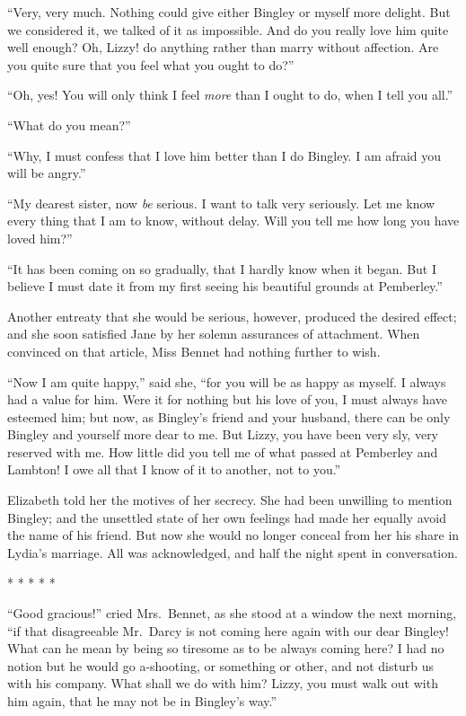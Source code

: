 ``Very, very much.  Nothing could give either Bingley or
myself more delight.  But we considered it, we talked of it as
impossible.  And do you really love him quite well enough?
Oh, Lizzy! do anything rather than marry without affection.
Are you quite sure that you feel what you ought to do?''

``Oh, yes!  You will only think I feel \emph{more} than I ought to
do, when I tell you all.''

``What do you mean?''

``Why, I must confess that I love him better than I do Bingley.
I am afraid you will be angry.''

``My dearest sister, now \emph{be} serious.  I want to talk very
seriously.  Let me know every thing that I am to know, without
delay.  Will you tell me how long you have loved him?''

``It has been coming on so gradually, that I hardly know when it
began.  But I believe I must date it from my first seeing his
beautiful grounds at Pemberley.''

Another entreaty that she would be serious, however, produced
the desired effect; and she soon satisfied Jane by her solemn
assurances of attachment.  When convinced on that article, Miss
Bennet had nothing further to wish.

``Now I am quite happy,'' said she, ``for you will be as happy as
myself.  I always had a value for him.  Were it for nothing but
his love of you, I must always have esteemed him; but now, as
Bingley's friend and your husband, there can be only Bingley
and yourself more dear to me.  But Lizzy, you have been very
sly, very reserved with me.  How little did you tell me of what
passed at Pemberley and Lambton!  I owe all that I know of it
to another, not to you.''

Elizabeth told her the motives of her secrecy.  She had been
unwilling to mention Bingley; and the unsettled state of her
own feelings had made her equally avoid the name of his friend.
But now she would no longer conceal from her his share in
Lydia's marriage.  All was acknowledged, and half the night
spent in conversation.

\begin{center}* * * * *\end{center}

``Good gracious!'' cried Mrs.\ Bennet, as she stood at a window
the next morning, ``if that disagreeable Mr.\ Darcy is not coming
here again with our dear Bingley!  What can he mean by being so
tiresome as to be always coming here?  I had no notion but he
would go a-shooting, or something or other, and not disturb us
with his company.  What shall we do with him?  Lizzy, you must
walk out with him again, that he may not be in Bingley's way.''

